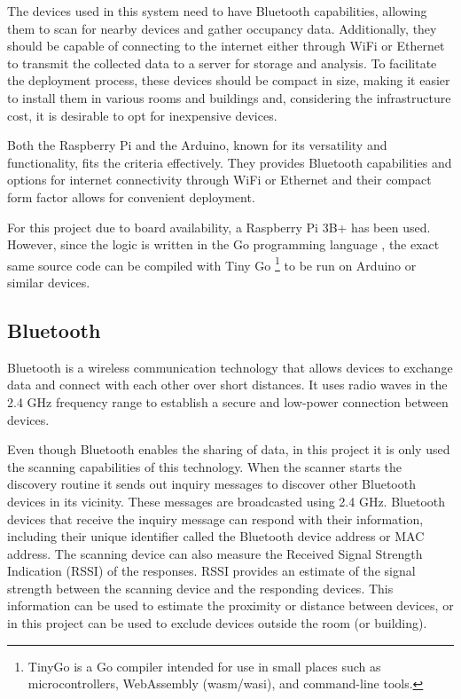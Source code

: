 \documentclass[a4paper, 11pt]{article}
\begin{document}
The devices used in this system need to have Bluetooth capabilities, allowing them to scan for nearby devices and gather occupancy data. Additionally, they should be capable of connecting to the internet either through WiFi or Ethernet to transmit the collected data to a server for storage and analysis. To facilitate the deployment process, these devices should be compact in size, making it easier to install them in various rooms and buildings and, considering the infrastructure cost, it is desirable to opt for inexpensive devices.

Both the Raspberry Pi and the Arduino, known for its versatility and functionality, fits the criteria effectively. They provides Bluetooth capabilities and options for internet connectivity through WiFi or Ethernet and their compact form factor allows for convenient deployment.

For this project due to board availability, a Raspberry Pi 3B+ has been used. However, since the logic is written in the Go programming language \cite{golang}, the exact same source code can be compiled with Tiny Go \cite{tinygo} \footnote{TinyGo is a Go compiler intended for use in small places such as microcontrollers, WebAssembly (wasm/wasi), and command-line tools.} to be run on Arduino or similar devices.

\subsection{Bluetooth}
Bluetooth is a wireless communication technology that allows devices to exchange data and connect with each other over short distances. It uses radio waves in the 2.4 GHz frequency range to establish a secure and low-power connection between devices.

Even though Bluetooth enables the sharing of data, in this project it is only used the scanning capabilities of this technology. When the scanner starts the discovery routine it sends out inquiry messages to discover other Bluetooth devices in its vicinity. These messages are broadcasted using 2.4 GHz. Bluetooth devices that receive the inquiry message can respond with their information, including their unique identifier called the Bluetooth device address or MAC address. The scanning device can also measure the Received Signal Strength Indication (RSSI) of the responses. RSSI provides an estimate of the signal strength between the scanning device and the responding devices. This information can be used to estimate the proximity or distance between devices, or in this project can be used to exclude devices outside the room (or building). 
\end{document}
